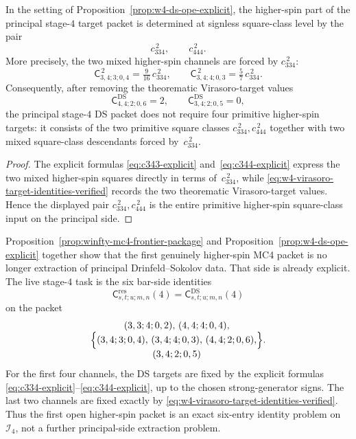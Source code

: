 \begin{corollary}
\label{cor:w4-ds-stage4-square-class-reduction}
In the setting of
Proposition~\ref{prop:w4-ds-ope-explicit}, the higher-spin part of the
principal stage-$4$ target packet is determined at signless
square-class level by the pair
\[
c_{334}^{\,2},
\qquad
c_{444}^{\,2}.
\]
More precisely, the two mixed higher-spin channels are forced by
$c_{334}^{\,2}$:
\[
\mathsf{C}_{3,4;3;0,4}^{\,2}
= \tfrac{9}{16}\,c_{334}^{\,2},
\qquad
\mathsf{C}_{3,4;4;0,3}^{\,2}
= \tfrac{5}{7}\,c_{334}^{\,2}.
\]
Consequently, after removing the theorematic Virasoro-target values
\[
\mathsf{C}^{\mathrm{DS}}_{4,4;2;0,6}=2,
\qquad
\mathsf{C}^{\mathrm{DS}}_{3,4;2;0,5}=0,
\]
the principal stage-$4$ DS packet does not require four primitive
higher-spin targets: it consists of the two primitive square classes
$c_{334}^{\,2},c_{444}^{\,2}$ together with two mixed square-class
descendants forced by~$c_{334}^{\,2}$.
\end{corollary}

\begin{proof}
The explicit formulas
\eqref{eq:c343-explicit} and~\eqref{eq:c344-explicit} express the two
mixed higher-spin squares directly in terms of~$c_{334}^{\,2}$, while
\eqref{eq:w4-virasoro-target-identities-verified} records the two
theorematic Virasoro-target values.  Hence the displayed pair
$c_{334}^{\,2},c_{444}^{\,2}$ is the entire primitive higher-spin
square-class input on the principal side.
\end{proof}

\begin{remark}
\label{rem:winfty-stage4-exact-identity-packet}
Proposition~\ref{prop:winfty-mc4-frontier-package} and
Proposition~\ref{prop:w4-ds-ope-explicit} together show that the first
genuinely higher-spin MC4 packet is no longer extraction of principal
Drinfeld--Sokolov data.  That side is already explicit.  The live
stage-$4$ task is the six bar-side identities
\[
\mathsf{C}^{\mathrm{res}}_{s,t;u;m,n}(4)
=
\mathsf{C}^{\mathrm{DS}}_{s,t;u;m,n}(4)
\]
on the packet
\[
\Bigl\{
\begin{gathered}
(3,3;4;0,2),\,
(4,4;4;0,4),\\
(3,4;3;0,4),\,
(3,4;4;0,3),\,
(4,4;2;0,6),\\
(3,4;2;0,5)
\end{gathered}
\Bigr\}.
\]
For the first four channels, the DS targets are fixed by the explicit
formulas \eqref{eq:c334-explicit}--\eqref{eq:c344-explicit}, up to the
chosen strong-generator signs.  The last two channels are fixed exactly
by \eqref{eq:w4-virasoro-target-identities-verified}.  Thus the first open higher-spin
packet is an exact six-entry identity problem on~$\mathcal{I}_4$, not a
further principal-side extraction problem.
\end{remark}

